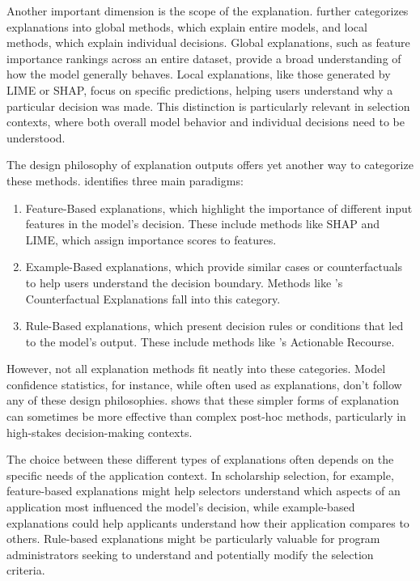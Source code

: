 Another important dimension is the scope of the explanation. \textcite{molnar_interpretable_2019} further categorizes explanations into global methods, which explain entire models, and local methods, which explain individual decisions. Global explanations, such as feature importance rankings across an entire dataset, provide a broad understanding of how the model generally behaves. Local explanations, like those generated by LIME or SHAP, focus on specific predictions, helping users understand why a particular decision was made. This distinction is particularly relevant in selection contexts, where both overall model behavior and individual decisions need to be understood.

The design philosophy of explanation outputs offers yet another way to categorize these methods. \textcite{friedrich_taxonomy_2011} identifies three main paradigms:

\begin{enumerate}
    \item Feature-Based explanations, which highlight the importance of different input features in the model's decision. These include methods like SHAP and LIME, which assign importance scores to features.
    \item Example-Based explanations, which provide similar cases or counterfactuals to help users understand the decision boundary. Methods like \textcite{wachter_counterfactual_2017}'s Counterfactual Explanations fall into this category.
    \item Rule-Based explanations, which present decision rules or conditions that led to the model's output. These include methods like \textcite{ustun_actionable_2019}'s Actionable Recourse.
\end{enumerate}

However, not all explanation methods fit neatly into these categories. Model confidence statistics, for instance, while often used as explanations, don't follow any of these design philosophies. \textcite{zhang_effect_2020} shows that these simpler forms of explanation can sometimes be more effective than complex post-hoc methods, particularly in high-stakes decision-making contexts.

The choice between these different types of explanations often depends on the specific needs of the application context. In scholarship selection, for example, feature-based explanations might help selectors understand which aspects of an application most influenced the model's decision, while example-based explanations could help applicants understand how their application compares to others. Rule-based explanations might be particularly valuable for program administrators seeking to understand and potentially modify the selection criteria.

